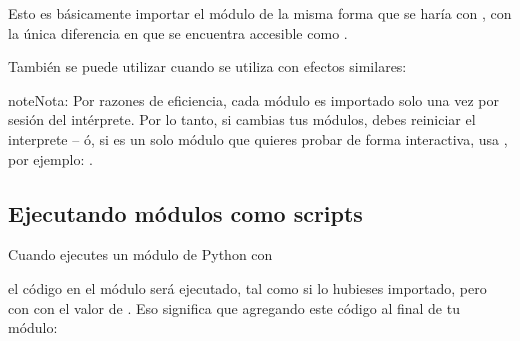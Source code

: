 \documentclass[a5paper,10pt,spanish]{sphinxmanual}
\begin{document}
\sphinxAtStartPar
Esto es básicamente importar el módulo de la misma forma que se haría con , con la única diferencia en que se encuentra accesible como .

\sphinxAtStartPar
También se puede utilizar cuando se utiliza  con efectos similares:

\begin{sphinxVerbatim}[commandchars=\\\{\}]
     
\end{sphinxVerbatim}

\begin{sphinxadmonition}{note}{Nota:}
\sphinxAtStartPar
Por razones de eficiencia, cada módulo es importado solo una vez por sesión del intérprete. Por lo tanto, si cambias tus módulos, debes reiniciar el interprete – ó, si es un solo módulo que quieres probar de forma interactiva, usa , por ejemplo: .
\end{sphinxadmonition}


\subsection{Ejecutando módulos como scripts}
\label{\detokenize{tutorial/modules:executing-modules-as-scripts}}\label{\detokenize{tutorial/modules:tut-modulesasscripts}}
\sphinxAtStartPar
Cuando ejecutes un módulo de Python con

\begin{sphinxVerbatim}[commandchars=\\\{\}]
  
\end{sphinxVerbatim}

\sphinxAtStartPar
el código en el módulo será ejecutado, tal como si lo hubieses importado, pero con  con el valor de .  Eso significa que agregando este código al final de tu módulo:

\begin{sphinxVerbatim}[commandchars=\\\{\}]
   
     
    \PYG{p}{[}\PYG{p}{]}
\end{sphinxVerbatim}
\end{document}
